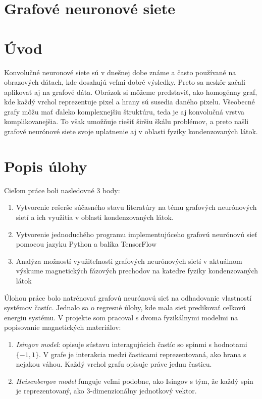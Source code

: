 \documentclass{article}
\begin{document}
\section*{Grafové neuronové siete}

\section*{Úvod}
Konvolučné neuronové siete sú v dnešnej dobe známe a často používané na obrazových dátach, kde dosahujú veľmi dobré výsledky. Preto sa neskôr začali aplikovať aj na grafové dáta. Obrázok si môžeme predstaviť, ako homogénny graf, kde každý vrchol reprezentuje pixel a hrany sú susedia daného pixelu. Všeobecné grafy môžu mať ďaleko komplexnejšiu štruktúru, teda je aj konvolučná vrstva komplikovanejšia. To však umožňuje riešiť širšiu škálu problémov, a preto našli grafové neurónové siete svoje uplatnenie aj v oblasti fyziky kondenzovaných látok.

\section*{Popis úlohy}
Cieľom práce boli nasledovné 3 body: 
\begin{enumerate}
    \item Vytvorenie rešerše súčasného stavu literatúry na tému grafových neurónových sietí a ich
    využitia v oblasti kondenzovaných látok.
    \item Vytvorenie jednoduchého programu implementujúceho grafovú neurónovú sieť pomocou jazyku
    Python a balíka TensorFlow
    \item Analýza možností využiteľnosti grafových neurónových sietí v aktuálnom výskume magnetických
    fázových prechodov na katedre fyziky kondenzovaných látok
\end{enumerate}

Úlohou práce bolo natrénovať grafovú neurónovú sieť na odhadovanie vlastností systémov častíc. Jednalo sa o regresné úlohy, kde mala sieť predikovať celkovú energiu systému. V projekte som pracoval s dvoma fyzikálnymi modelmi na popisovanie magnetických materiálov:
\begin{enumerate}
    \item \textit{Isingov model}: opisuje sústavu interagujúcich častíc so spinmi s hodnotami $\{-1, 1\}$. V grafe je interakcia medzi časticami reprezentovaná, ako hrana s nejakou váhou. Každý vrchol grafu opisuje práve jednu časticu.
    \item \textit{Heisenbergov model} funguje veľmi podobne, ako Isingov s tým, že každý spin je reprezentovaný, ako 3-dimenzionálny jednotkový vektor.
\end{enumerate}  
\end{document}
